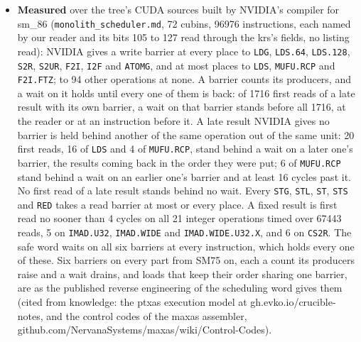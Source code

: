 \begin{itemize}
\item \textbf{Measured} over the tree's CUDA sources built by NVIDIA's compiler for sm\_\allowbreak{}86 (\texttt{monolith\_\allowbreak{}scheduler.\allowbreak{}md}, 72 cubins, 96976 instructions, each named by our reader and its bits 105 to 127 read through the krs's fields, no listing read): NVIDIA gives a write barrier at every place to \texttt{LDG}, \texttt{LDS.\allowbreak{}64}, \texttt{LDS.\allowbreak{}128}, \texttt{S2R}, \texttt{S2UR}, \texttt{F2I}, \texttt{I2F} and \texttt{ATOMG}, and at most places to \texttt{LDS}, \texttt{MUFU.\allowbreak{}RCP} and \texttt{F2I.\allowbreak{}FTZ}; to 94 other operations at none. A barrier counts its producers, and a wait on it holds until every one of them is back: of 1716 first reads of a late result with its own barrier, a wait on that barrier stands before all 1716, at the reader or at an instruction before it. A late result NVIDIA gives no barrier is held behind another of the same operation out of the same unit: 20 first reads, 16 of \texttt{LDS} and 4 of \texttt{MUFU.\allowbreak{}RCP}, stand behind a wait on a later one's barrier, the results coming back in the order they were put; 6 of \texttt{MUFU.\allowbreak{}RCP} stand behind a wait on an earlier one's barrier and at least 16 cycles past it. No first read of a late result stands behind no wait. Every \texttt{STG}, \texttt{STL}, \texttt{ST}, \texttt{STS} and \texttt{RED} takes a read barrier at most or every place. A fixed result is first read no sooner than 4 cycles on all 21 integer operations timed over 67443 reads, 5 on \texttt{IMAD.\allowbreak{}U32}, \texttt{IMAD.\allowbreak{}WIDE} and \texttt{IMAD.\allowbreak{}WIDE.\allowbreak{}U32.\allowbreak{}X}, and 6 on \texttt{CS2R}. The safe word waits on all six barriers at every instruction, which holds every one of these. Six barriers on every part from SM75 on, each a count its producers raise and a wait drains, and loads that keep their order sharing one barrier, are as the published reverse engineering of the scheduling word gives them (cited from knowledge: the ptxas execution model at gh.evko.io/crucible-notes, and the control codes of the maxas assembler, github.com/NervanaSystems/maxas/wiki/Control-Codes).
\end{itemize}
